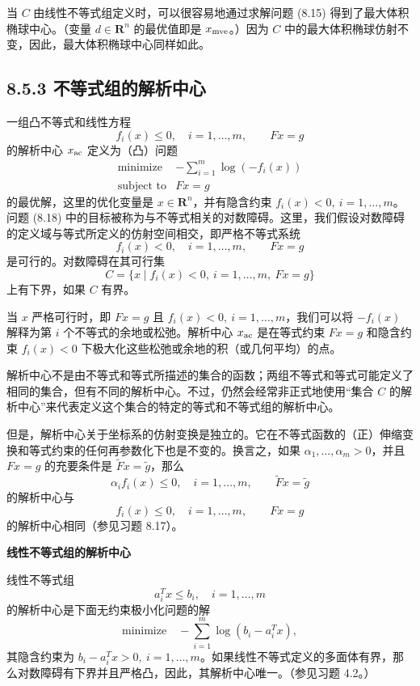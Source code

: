 \documentclass[UTF8, 12pt, fontset=fandol, oneside]{ctexart}
\begin{document}
当 $C$ 由线性不等式组定义时，可以很容易地通过求解问题 (8.15) 得到了最大体积椭球中心。（变量 $d\in\mathbf{R}^n$ 的最优值即是 $x_{\rm mve}$。）因为 $C$ 中的最大体积椭球仿射不变，因此，最大体积椭球中心同样如此。

\subsection*{8.5.3 不等式组的解析中心}

一组凸不等式和线性方程
\[
f_i(x)\leq 0,\quad i=1,\ldots,m,\qquad Fx=g
\]
的解析中心 $x_{\rm ac}$ 定义为（凸）问题
\[
\begin{array}{ll}
\mbox{minimize} & -\displaystyle\sum_{i=1}^m \log(-f_i(x))\\
\mbox{subject to} & Fx=g
\end{array}
\tag{8.18}
\]
的最优解，这里的优化变量是 $x\in\mathbf{R}^n$，并有隐含约束 $f_i(x)<0,\ i=1,\ldots,m$。问题 (8.18) 中的目标被称为与不等式相关的对数障碍。这里，我们假设对数障碍的定义域与等式所定义的仿射空间相交，即严格不等式系统
\[
f_i(x)<0,\quad i=1,\ldots,m,\qquad Fx=g
\]
是可行的。对数障碍在其可行集
\[
C=\{x\mid f_i(x)<0,\ i=1,\ldots,m,\ Fx=g\}
\]
上有下界，如果 $C$ 有界。

当 $x$ 严格可行时，即 $Fx=g$ 且 $f_i(x)<0,\ i=1,\ldots,m$，我们可以将 $-f_i(x)$ 解释为第 $i$ 个不等式的余地或松弛。解析中心 $x_{\rm ac}$ 是在等式约束 $Fx=g$ 和隐含约束 $f_i(x)<0$ 下极大化这些松弛或余地的积（或几何平均）的点。

解析中心不是由不等式和等式所描述的集合的函数；两组不等式和等式可能定义了相同的集合，但有不同的解析中心。不过，仍然会经常非正式地使用“集合 $C$ 的解析中心”来代表定义这个集合的特定的等式和不等式组的解析中心。

但是，解析中心关于坐标系的仿射变换是独立的。它在不等式函数的（正）伸缩变换和等式约束的任何再参数化下也是不变的。换言之，如果 $\alpha_1,\ldots,\alpha_m>0$，并且 $Fx=g$ 的充要条件是 $\tilde F x=\tilde g$，那么
\[
\alpha_i f_i(x)\leq 0,\quad i=1,\ldots,m,\qquad \tilde F x=\tilde g
\]
的解析中心与
\[
f_i(x)\leq 0,\quad i=1,\ldots,m,\qquad Fx=g
\]
的解析中心相同（参见习题 8.17）。

\noindent\textbf{线性不等式组的解析中心}

线性不等式组
\[
a_i^Tx\leq b_i,\quad i=1,\ldots,m
\]
的解析中心是下面无约束极小化问题的解
\[
\mbox{minimize}\quad -\sum_{i=1}^m \log(b_i-a_i^Tx),
\tag{8.19}
\]
其隐含约束为 $b_i-a_i^Tx>0,\ i=1,\ldots,m$。如果线性不等式定义的多面体有界，那么对数障碍有下界并且严格凸，因此，其解析中心唯一。（参见习题 4.2。）
\end{document}
